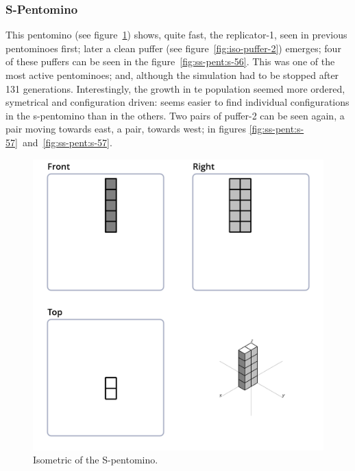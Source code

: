 \subsubsection{S-Pentomino}
\label{sec:s-pentomino}
This pentomino (see figure~\ref{fig:iso-pent-s}) shows, quite fast, the
replicator-1, seen in previous pentominoes first; later a clean puffer
(see figure~\ref{fig:iso-puffer-2}) emerges; four of these puffers can be seen
in the figure~\ref{fig:ss-pent:s-56}. This was one of the most active
pentominoes; and, although the simulation had to be stopped after 131
generations. Interestingly, the growth in te population seemed more ordered,
symetrical and configuration driven: seems easier to find individual
configurations in the s-pentomino than in the others. Two pairs of puffer-2
can be seen again, a pair moving towards east, a pair, towards west; in figures
\ref{fig:ss-pent:s-57}~and~\ref{fig:ss-pent:s-57}.

\begin{figure}
	\centering
	\includegraphics[scale=0.3]{iso_diagrams/o.png}
	\caption{Isometric of the S-pentomino.}
  \label{fig:iso-pent-s}
\end{figure}

